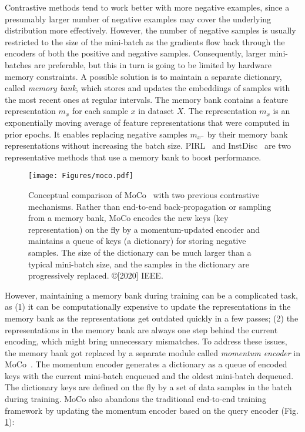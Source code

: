\documentclass[lettersize,journal]{IEEEtran}
\begin{document}
Contrastive methods tend to work better with more negative examples, since a presumably larger number of negative examples may cover the underlying distribution more effectively. However, the number of negative samples is usually restricted to the size of the mini-batch as the gradients flow back through the encoders of both the positive and negative samples. Consequently, larger mini-batches are preferable, but this in turn is going to be limited by hardware memory constraints. A possible solution is to maintain a separate dictionary, called \textit{memory bank}, which stores and updates the embeddings of samples with the most recent ones at regular intervals. The memory bank contains a feature representation $m_{x}$ for each sample $x$ in dataset $X$. The representation $m_{x}$ is an exponentially moving average of feature representations that were computed in prior epochs. It enables replacing negative samples $m_{x^{-}}$ by their memory bank representations without increasing the batch size. PIRL~\cite{misra2020self} and InstDisc~\cite{wu2018unsupervised} are two representative methods that use a memory bank to boost performance. 

\begin{figure}
\centering
\texttt{[image: Figures/moco.pdf]}
\caption[moco]{Conceptual comparison of MoCo~\cite{he2020momentum} with two previous contrastive mechanisms. Rather than end-to-end back-propagation or sampling from a memory bank, MoCo encodes the new keys (key representation) on the fly by a momentum-updated encoder and maintains a queue of keys (a dictionary) for storing negative samples. The size of the dictionary can be much larger than a typical mini-batch size, and the samples in the dictionary are progressively replaced. ©[2020] IEEE.}
\label{fig:moco}
\end{figure}

However, maintaining a memory bank during training can be a complicated task, as (1) it can be computationally expensive to update the representations in the memory bank as the representations get outdated quickly in a few passes; (2) the representations in the memory bank are always one step behind the current encoding, which might bring unnecessary mismatches. To address these issues, the memory bank got replaced by a separate module called \textit{momentum encoder} in MoCo~\cite{he2020momentum}. The momentum encoder generates a dictionary as a queue of encoded keys with the current mini-batch enqueued and the oldest mini-batch dequeued. The dictionary keys are defined on the fly by a set of data samples in the batch during training. MoCo also abandons the traditional end-to-end training framework by updating the momentum encoder based on the query encoder (Fig. \ref{fig:moco}):
\end{document}
